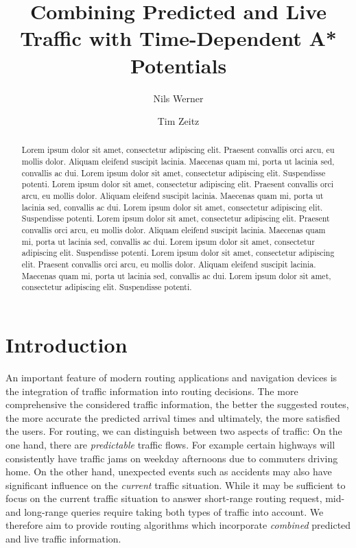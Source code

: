 \documentclass[a4paper,UKenglish,cleveref, autoref, thm-restate,anonymous]{lipics-v2021}
\title{Combining Predicted and Live Traffic with Time-Dependent A* Potentials}
\author{Nils Werner}{Karlsruhe Institute of Technology, Germany}{}{}{}
\author{Tim Zeitz}{Karlsruhe Institute of Technology, Germany}{tim.zeitz@kit.edu}{https://orcid.org/0000-0003-4746-3582}{}
\begin{document}
\maketitle

\begin{abstract}
Lorem ipsum dolor sit amet, consectetur adipiscing elit. Praesent convallis orci arcu, eu mollis dolor. Aliquam eleifend suscipit lacinia. Maecenas quam mi, porta ut lacinia sed, convallis ac dui. Lorem ipsum dolor sit amet, consectetur adipiscing elit. Suspendisse potenti. 
Lorem ipsum dolor sit amet, consectetur adipiscing elit. Praesent convallis orci arcu, eu mollis dolor. Aliquam eleifend suscipit lacinia. Maecenas quam mi, porta ut lacinia sed, convallis ac dui. Lorem ipsum dolor sit amet, consectetur adipiscing elit. Suspendisse potenti.
Lorem ipsum dolor sit amet, consectetur adipiscing elit. Praesent convallis orci arcu, eu mollis dolor. Aliquam eleifend suscipit lacinia. Maecenas quam mi, porta ut lacinia sed, convallis ac dui. Lorem ipsum dolor sit amet, consectetur adipiscing elit. Suspendisse potenti.
Lorem ipsum dolor sit amet, consectetur adipiscing elit. Praesent convallis orci arcu, eu mollis dolor. Aliquam eleifend suscipit lacinia. Maecenas quam mi, porta ut lacinia sed, convallis ac dui. Lorem ipsum dolor sit amet, consectetur adipiscing elit. Suspendisse potenti.
\end{abstract}

\section{Introduction}

An important feature of modern routing applications and navigation devices is the integration of traffic information into routing decisions.
The more comprehensive the considered traffic information, the better the suggested routes, the more accurate the predicted arrival times and ultimately, the more satisfied the users.
For routing, we can distinguish between two aspects of traffic:
On the one hand, there are \emph{predictable} traffic flows.
For example certain highways will consistently have traffic jams on weekday afternoons due to commuters driving home.
On the other hand, unexpected events such as accidents may also have significant influence on the \emph{current} traffic situation.
While it may be sufficient to focus on the current traffic situation to answer short-range routing request, mid- and long-range queries require taking both types of traffic into account.
We therefore aim to provide routing algorithms which incorporate \emph{combined} predicted and live traffic information.
\end{document}
